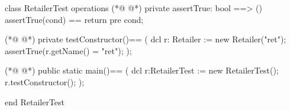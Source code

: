 \begin{vdmpp}[breaklines=true]
class RetailerTest
 operations
(*@
\label{assertTrue:3}
@*)
  private assertTrue: bool ==> ()
    assertTrue(cond) == return
    pre cond;
    
(*@
\label{testConstructor:7}
@*)
  private testConstructor()==
  (
   dcl r: Retailer := new Retailer("ret");
   assertTrue(r.getName() = "ret");
  );
 
(*@
\label{main:13}
@*)
  public static main()==
    (
   dcl r:RetailerTest := new RetailerTest();
   r.testConstructor();
    );

end RetailerTest
\end{vdmpp}
